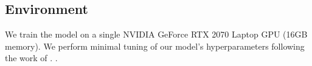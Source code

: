 \subsection{Environment}
We train the model on a single NVIDIA GeForce RTX 2070 Laptop GPU (16GB memory). We perform minimal tuning of our model's hyperparameters following the work of .
.
